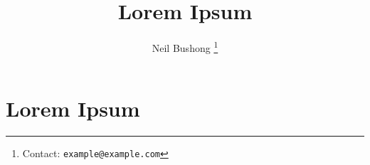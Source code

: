 \documentclass[11pt]{article}
\title{Lorem Ipsum}
\author{Neil Bushong
  \footnote{Contact: \texttt{example@example.com}}
}
\begin{document}
\maketitle

\begin{abstract}
\lipsum[1]
\end{abstract}


\section{Lorem Ipsum} \label{sec:tmp}

\lipsum[1]


%
%
%
\end{document}
